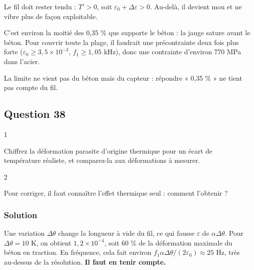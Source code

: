 \documentclass[11pt,a4paper]{article}
\renewcommand{\geq}{\geqslant}
\newcommand{\equationajustee}[1]{%
  \sbox{\boiteequation}{$\displaystyle #1$}%
  \ifdim\wd\boiteequation>\linewidth
    \[\resizebox{\linewidth}{!}{\usebox{\boiteequation}}\]%
  \else
    \[#1\]%
  \fi}
\begin{document}
Le fil doit rester tendu : \(T'>0\), soit \(\varepsilon_0 + \Delta\varepsilon>0\). Au-delà, il devient mou et ne vibre plus de façon exploitable.

\equationajustee{\boxed{|\Delta\varepsilon|_{\max} = \varepsilon_0\approx1{,}8\times10^{-3} = 0{,}18\ \%}}

C'est environ la moitié des 0,35 \% que supporte le béton : la jauge sature avant le béton. Pour couvrir toute la plage, il faudrait une précontrainte deux fois plus forte (\(\varepsilon_0\geq3{,}5\times10^{-3}\), \(f_1\geq1{,}05\) kHz), donc une contrainte d'environ 770 MPa dans l'acier.

\begin{piege}

La limite ne vient pas du béton mais du capteur : répondre « 0,35 \% » ne tient pas compte du fil.

\end{piege}

\hypertarget{question-38}{%
\subsection{Question 38}\label{question-38}}

\begin{indication}{1}

Chiffrez la déformation parasite d'origine thermique pour un écart de température réaliste, et comparez-la aux déformations à mesurer.

\end{indication}

\begin{indication}{2}

Pour corriger, il faut connaître l'effet thermique seul : comment l'obtenir ?

\end{indication}

\hypertarget{solution-37}{%
\subsubsection{Solution}\label{solution-37}}

Une variation \(\Delta\theta\) change la longueur à vide du fil, ce qui fausse \(\varepsilon\) de \(\alpha\Delta\theta\). Pour \(\Delta\theta = 10\) K, on obtient \(1{,}2\times10^{-4}\), soit 60 \% de la déformation maximale du béton en traction. En fréquence, cela fait environ \(f_1\alpha\Delta\theta/(2\varepsilon_0)\approx25\) Hz, très au-dessus de la résolution. \textbf{Il faut en tenir compte.}
\end{document}
